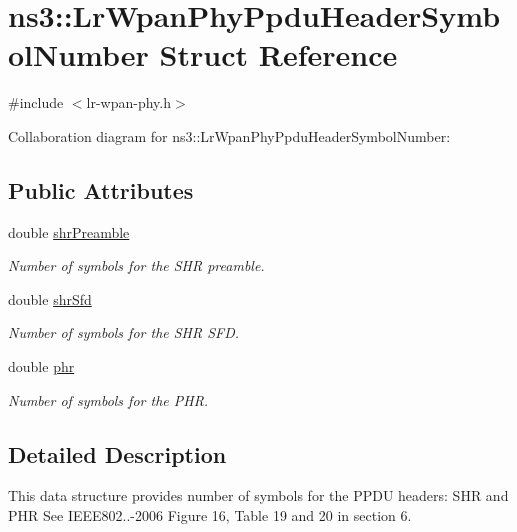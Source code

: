 \hypertarget{structns3_1_1LrWpanPhyPpduHeaderSymbolNumber}{}\section{ns3\+:\+:Lr\+Wpan\+Phy\+Ppdu\+Header\+Symbol\+Number Struct Reference}
\label{structns3_1_1LrWpanPhyPpduHeaderSymbolNumber}


{\ttfamily \#include $<$lr-\/wpan-\/phy.\+h$>$}



Collaboration diagram for ns3\+:\+:Lr\+Wpan\+Phy\+Ppdu\+Header\+Symbol\+Number\+:
\subsection*{Public Attributes}
\begin{DoxyCompactItemize}
\item 
double \hyperlink{structns3_1_1LrWpanPhyPpduHeaderSymbolNumber_a670cc0687ee040a2671cd91e2f410332}{shr\+Preamble}
\begin{DoxyCompactList}\small\item\em Number of symbols for the S\+HR preamble. \end{DoxyCompactList}\item 
double \hyperlink{structns3_1_1LrWpanPhyPpduHeaderSymbolNumber_a253fa19060c1826012ec685cec394025}{shr\+Sfd}
\begin{DoxyCompactList}\small\item\em Number of symbols for the S\+HR S\+FD. \end{DoxyCompactList}\item 
double \hyperlink{structns3_1_1LrWpanPhyPpduHeaderSymbolNumber_a271039a734fb640a5b80e5fa52d77a96}{phr}
\begin{DoxyCompactList}\small\item\em Number of symbols for the P\+HR. \end{DoxyCompactList}\end{DoxyCompactItemize}


\subsection{Detailed Description}
This data structure provides number of symbols for the P\+P\+DU headers\+: S\+HR and P\+HR See I\+E\+E\+E802..-\/2006 Figure 16, Table 19 and 20 in section 6. 

